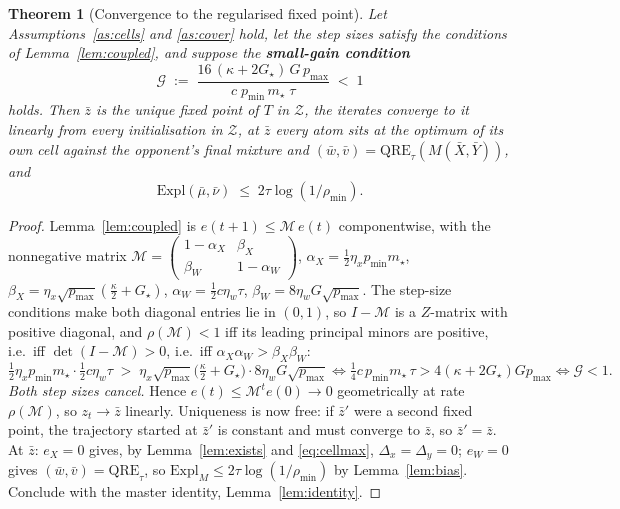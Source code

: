 \documentclass[11pt,a4paper]{article}
\theoremstyle{plain}
\newtheorem{theorem}{Theorem}[section]
\theoremstyle{definition}
\theoremstyle{remark}
\newcommand{\Expl}{\mathrm{Expl}}
\newcommand{\QRE}{\mathrm{QRE}}
\begin{document}
\begin{theorem}[Convergence to the regularised fixed point]\label{thm:main}
Let Assumptions~\ref{as:cells} and \ref{as:cover} hold, let the step sizes satisfy the
conditions of Lemma~\ref{lem:coupled}, and suppose the \textbf{small-gain condition}
\begin{equation}\label{eq:gain}
\boxed{\;\mathcal G \;:=\; \frac{16\,(\kappa+2G_\star)\,G\,p_{\max}}{c\;p_{\min}\,m_\star\;\tau}\;<\;1 \;}
\end{equation}
holds. Then $\bar z$ is the \emph{unique} fixed point of $T$ in $\mathcal Z$, the iterates
converge to it linearly from every initialisation in $\mathcal Z$, at $\bar z$ every atom
sits at the optimum of its own cell against the opponent's final mixture and
$(\bar w,\bar v)=\QRE_\tau(M(\bar X,\bar Y))$, and
\[
\Expl(\bar\mu,\bar\nu)\;\le\;2\tau\log(1/\rho_{\min}).
\]
\end{theorem}
\begin{proof}
Lemma~\ref{lem:coupled} is $e(t+1)\le\mathcal M\,e(t)$ componentwise, with the
nonnegative matrix
$\mathcal M=\begin{pmatrix}1-\alpha_X & \beta_X\\ \beta_W & 1-\alpha_W\end{pmatrix}$,
$\alpha_X=\tfrac12\eta_xp_{\min}m_\star$,
$\beta_X=\eta_x\sqrt{p_{\max}}(\tfrac{\kappa}{2}+G_\star)$,
$\alpha_W=\tfrac12c\eta_w\tau$, $\beta_W=8\eta_wG\sqrt{p_{\max}}$. The step-size
conditions make both diagonal entries lie in $(0,1)$, so $I-\mathcal M$ is a $Z$-matrix
with positive diagonal, and $\rho(\mathcal M)<1$ iff its leading principal minors are
positive, i.e.\ iff $\det(I-\mathcal M)>0$, i.e.\ iff $\alpha_X\alpha_W>\beta_X\beta_W$:
\[
\tfrac12\eta_xp_{\min}m_\star\cdot\tfrac12c\eta_w\tau
\;>\;\eta_x\sqrt{p_{\max}}\big(\tfrac{\kappa}{2}+G_\star\big)\cdot 8\eta_wG\sqrt{p_{\max}}
\iff \tfrac14c\,p_{\min}m_\star\,\tau>4(\kappa+2G_\star)Gp_{\max}\iff\mathcal G<1 .
\]
\emph{Both step sizes cancel.} Hence $e(t)\le\mathcal M^te(0)\to0$ geometrically at rate
$\rho(\mathcal M)$, so $z_t\to\bar z$ linearly. Uniqueness is now free: if $\bar z'$ were
a second fixed point, the trajectory started at $\bar z'$ is constant and must converge
to $\bar z$, so $\bar z'=\bar z$. At $\bar z$: $e_X=0$ gives, by
Lemma~\ref{lem:exists} and \eqref{eq:cellmax}, $\Delta_x=\Delta_y=0$; $e_W=0$ gives
$(\bar w,\bar v)=\QRE_\tau$, so $\Expl_M\le2\tau\log(1/\rho_{\min})$ by
Lemma~\ref{lem:bias}. Conclude with the master identity, Lemma~\ref{lem:identity}.
\end{proof}
\end{document}

